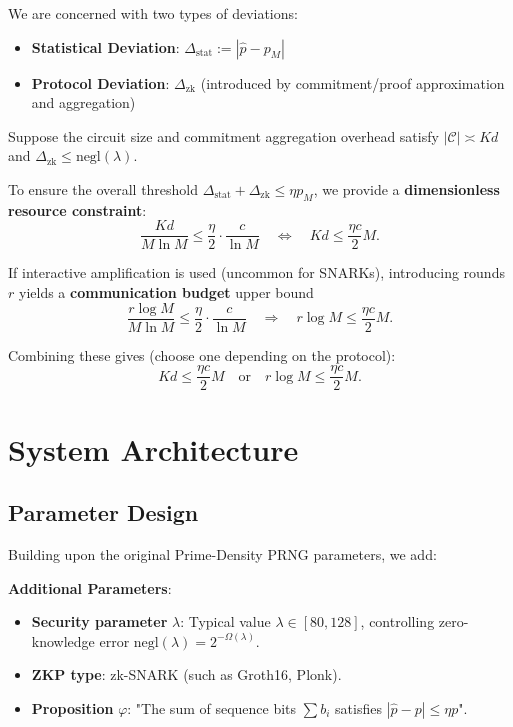 \documentclass[12pt]{article}
\theoremstyle{plain}
\theoremstyle{definition}
\begin{document}
We are concerned with two types of deviations:
\begin{itemize}
\item \textbf{Statistical Deviation}: $\Delta_{\text{stat}} := |\hat{p} - p_M|$
\item \textbf{Protocol Deviation}: $\Delta_{\text{zk}}$ (introduced by commitment/proof approximation and aggregation)
\end{itemize}

Suppose the circuit size and commitment aggregation overhead satisfy $|\mathcal{C}| \asymp Kd$ and $\Delta_{\text{zk}} \le \text{negl}(\lambda)$.

To ensure the overall threshold $\Delta_{\text{stat}} + \Delta_{\text{zk}} \le \eta p_M$, we provide a \textbf{dimensionless resource constraint}:
\[
\frac{Kd}{M\ln M} \le \frac{\eta}{2} \cdot \frac{c}{\ln M} \quad \Longleftrightarrow \quad Kd \le \frac{\eta c}{2} M.
\]

If interactive amplification is used (uncommon for SNARKs), introducing rounds $r$ yields a \textbf{communication budget} upper bound
\[
\frac{r \log M}{M \ln M} \le \frac{\eta}{2} \cdot \frac{c}{\ln M} \quad \Longrightarrow \quad r \log M \le \frac{\eta c}{2} M.
\]

Combining these gives (choose one depending on the protocol):
\[
\boxed{Kd \le \frac{\eta c}{2} M \quad \text{or} \quad r \log M \le \frac{\eta c}{2} M}.
\]

\section{System Architecture}

\subsection{Parameter Design}

Building upon the original Prime-Density PRNG parameters, we add:

\textbf{Additional Parameters}:
\begin{itemize}
\item \textbf{Security parameter} $\lambda$: Typical value $\lambda \in [80, 128]$, controlling zero-knowledge error $\text{negl}(\lambda) = 2^{-\Omega(\lambda)}$.
\item \textbf{ZKP type}: zk-SNARK (such as Groth16, Plonk).
\item \textbf{Proposition} $\varphi$: "The sum of sequence bits $\sum b_i$ satisfies $|\hat{p} - p| \le \eta p$".
\end{itemize}
\end{document}
